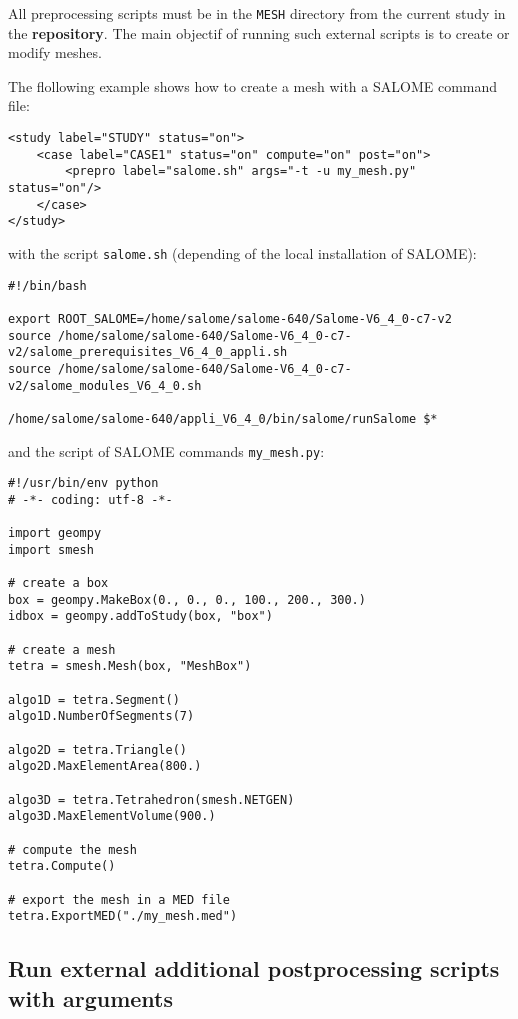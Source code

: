 \documentclass[a4paper,10pt,twoside]{csshortdoc}
\begin{document}
All preprocessing scripts must be in the \texttt{MESH} directory from
the current study in the \textbf{repository}.
The main objectif of running such external scripts is to create or modify
meshes.

The flollowing example shows how to create a mesh with a SALOME command file:
\small
\begin{verbatim}
<study label="STUDY" status="on">
    <case label="CASE1" status="on" compute="on" post="on">
        <prepro label="salome.sh" args="-t -u my_mesh.py" status="on"/>
    </case>
</study>
\end{verbatim}
\normalsize

with the script \texttt{salome.sh} (depending of the local installation of
SALOME):
\small
\begin{verbatim}
#!/bin/bash

export ROOT_SALOME=/home/salome/salome-640/Salome-V6_4_0-c7-v2
source /home/salome/salome-640/Salome-V6_4_0-c7-v2/salome_prerequisites_V6_4_0_appli.sh
source /home/salome/salome-640/Salome-V6_4_0-c7-v2/salome_modules_V6_4_0.sh

/home/salome/salome-640/appli_V6_4_0/bin/salome/runSalome $*
\end{verbatim}
\normalsize

and the script of SALOME commands \texttt{my\_mesh.py}:
\small
\begin{verbatim}
#!/usr/bin/env python
# -*- coding: utf-8 -*-

import geompy
import smesh

# create a box
box = geompy.MakeBox(0., 0., 0., 100., 200., 300.)
idbox = geompy.addToStudy(box, "box")

# create a mesh
tetra = smesh.Mesh(box, "MeshBox")

algo1D = tetra.Segment()
algo1D.NumberOfSegments(7)

algo2D = tetra.Triangle()
algo2D.MaxElementArea(800.)

algo3D = tetra.Tetrahedron(smesh.NETGEN)
algo3D.MaxElementVolume(900.)

# compute the mesh
tetra.Compute()

# export the mesh in a MED file
tetra.ExportMED("./my_mesh.med")
\end{verbatim}
\normalsize

\subsection{Run external additional postprocessing scripts with arguments}
\end{document}
